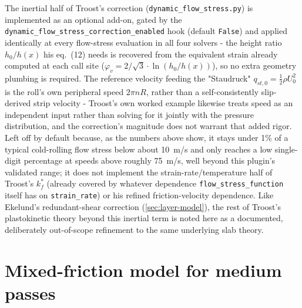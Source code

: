 \documentclass[11pt]{PyRollDocs}
\begin{document}
    The inertial half of Troost's correction (\lstinline{dynamic_flow_stress.py}) is implemented as an optional add-on, gated by the \lstinline{dynamic_flow_stress_correction_enabled} hook (default \lstinline{False}) and applied identically at every flow-stress evaluation in all four solvers - the height ratio $h_0/h(x)$ his eq.~(12) needs is recovered from the equivalent strain already computed at each call site ($\varphi_v = 2/\sqrt3\cdot\ln(h_0/h(x))$), so no extra geometry plumbing is required. The reference velocity feeding the "Staudruck" $q_{st,0}=\frac12\rho U_0^2$ is the roll's own peripheral speed $2\pi n R$, rather than a self-consistently slip-derived strip velocity - Troost's own worked example likewise treats speed as an independent input rather than solving for it jointly with the pressure distribution, and the correction's magnitude does not warrant that added rigor. Left off by default because, as the numbers above show, it stays under 1\% of a typical cold-rolling flow stress below about \SI{10}{m/s} and only reaches a low single-digit percentage at speeds above roughly \SI{75}{m/s}, well beyond this plugin's validated range; it does not implement the strain-rate/temperature half of Troost's $k_f^*$ (already covered by whatever dependence \lstinline{flow_stress_function} itself has on \lstinline{strain_rate}) or his refined friction-velocity dependence. Like Ekelund's redundant-shear correction (\autoref{sec:layer-model}), the rest of Troost's plastokinetic theory beyond this inertial term is noted here as a documented, deliberately out-of-scope refinement to the same underlying slab theory.


    \section{Mixed-friction model for medium passes}\label{sec:mixed-friction-model}
\end{document}
